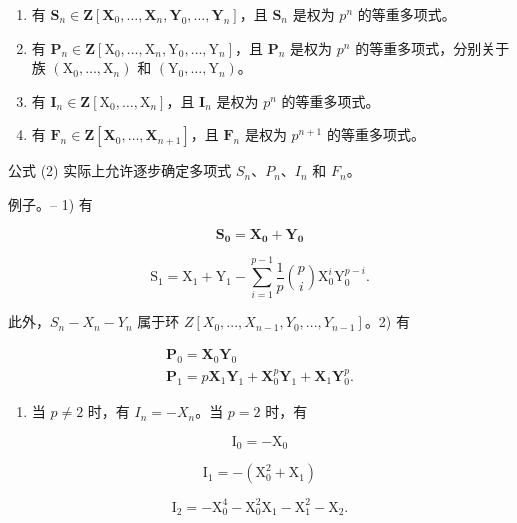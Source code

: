 \begin{enumerate}
\def\labelenumi{\alph{enumi})}
\item
  有 \(\mathbf{S}_n\in \mathbf{Z}[\mathbf{X}_0,\dots ,\mathbf{X}_n,\mathbf{Y}_0,\dots ,\mathbf{Y}_n]\)，且 \(\mathbf{S}_n\) 是权为 \(p^n\) 的等重多项式。
\item
  有 \(\mathbf{P}_n\in \mathbf{Z}[\mathrm{X}_0,\dots ,\mathrm{X}_n,\mathrm{Y}_0,\dots ,\mathrm{Y}_n]\)，且 \(\mathbf{P}_n\) 是权为 \(p^n\) 的等重多项式，分别关于族 \((\mathrm{X}_0,\dots ,\mathrm{X}_n)\) 和 \((\mathrm{Y}_0,\dots ,\mathrm{Y}_n)\)。
\item
  有 \(\mathbf{I}_n\in \mathbf{Z}[\mathrm{X}_0,\dots ,\mathrm{X}_n]\)，且 \(\mathbf{I}_n\) 是权为 \(p^n\) 的等重多项式。
\item
  有 \(\mathbf{F}_n\in \mathbf{Z}[\mathbf{X}_0,\dots ,\mathbf{X}_{n + 1}]\)，且 \(\mathbf{F}_n\) 是权为 \(p^{n + 1}\) 的等重多项式。
\end{enumerate}

公式 (2) 实际上允许逐步确定多项式 \(S_{n}\)、\(P_{n}\)、\(I_{n}\) 和 \(F_{n}\)。

例子。-- 1) 有

\[
\mathbf {S _ {0}} = \mathbf {X _ {0}} + \mathbf {Y _ {0}}
\]

\[
\mathrm{S} _ {1} = \mathrm{X} _ {1} + \mathrm{Y} _ {1} - \sum_ {i = 1} ^ {p - 1} \frac {1}{p} \binom {p} {i} \mathrm{X} _ {0} ^ {i} \mathrm{Y} _ {0} ^ {p - i}.
\]

此外，\(S_{n} - X_{n} - Y_{n}\) 属于环 \(Z[X_{0}, ..., X_{n-1}, Y_{0}, ..., Y_{n-1}]\)。2) 有

\[
\begin{array}{l} \mathbf {P} _ {0} = \mathbf {X} _ {0} \mathbf {Y} _ {0} \\ \mathbf {P} _ {1} = p \mathbf {X} _ {1} \mathbf {Y} _ {1} + \mathbf {X} _ {0} ^ {p} \mathbf {Y} _ {1} + \mathbf {X} _ {1} \mathbf {Y} _ {0} ^ {p}. \end{array}
\]

\begin{enumerate}
\def\labelenumi{\arabic{enumi})}
\setcounter{enumi}{2}
\tightlist
\item
  当 \(p \neq 2\) 时，有 \(I_n = -X_n\)。当 \(p = 2\) 时，有
\end{enumerate}

\[
\mathrm{I} _ {0} = - \mathrm{X} _ {0}
\]

\[
\mathrm{I} _ {1} = - \left(\mathrm{X} _ {0} ^ {2} + \mathrm{X} _ {1}\right)
\]

\[
\mathrm{I} _ {2} = - \mathrm{X} _ {0} ^ {4} - \mathrm{X} _ {0} ^ {2} \mathrm{X} _ {1} - \mathrm{X} _ {1} ^ {2} - \mathrm{X} _ {2}.
\]

